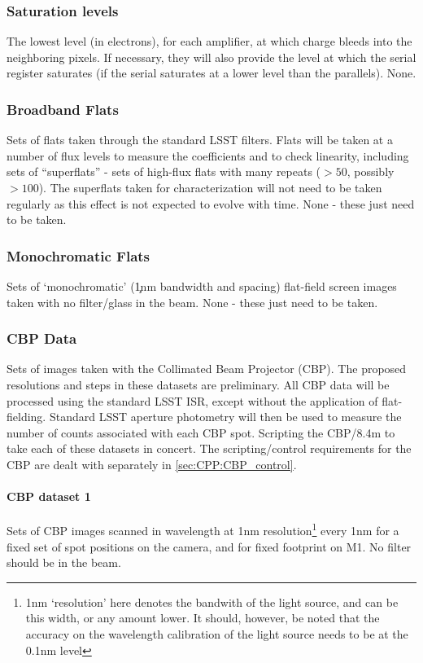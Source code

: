 \subsubsection{Saturation levels}\label{sec:CPP:inputs:saturationLevel}
\cameraTeam
The lowest level (in electrons), for each amplifier, at which charge bleeds into the neighboring pixels. If necessary, they will also provide the level at which the serial register saturates (\ie if the serial saturates at a lower level than the parallels).
\alg None.


\subsubsection{Broadband Flats}\label{sec:CPP:inputs:broadFlat}
Sets of flats taken through the standard LSST filters. Flats will be taken at a number of flux levels to measure the \bfeffect coefficients and to check linearity, including sets of ``superflats'' - sets of high-flux flats with many repeats ($>50$, possibly $>100$). The superflats taken for \bfeffect characterization will not need to be taken regularly as this effect is not expected to evolve with time.
\alg None - these just need to be taken.


\subsubsection{Monochromatic Flats}\label{sec:CPP:inputs:monoFlat}
Sets of `monochromatic' (\c 1nm bandwidth and spacing) flat-field screen images taken with no filter/glass in the beam.
\alg None - these just need to be taken.


\subsubsection{CBP Data}\label{sec:CPP:inputs:CBP}
Sets of images taken with the Collimated Beam Projector (CBP). The proposed resolutions and steps in these datasets are preliminary. All CBP data will be processed using the standard LSST ISR, except without the application of flat-fielding. Standard LSST aperture photometry will then be used to measure the number of counts associated with each CBP spot.
\alg Scripting the CBP/8.4m to take each of these datasets in concert. The scripting/control requirements for the CBP are dealt with separately in \secsymbol\ref{sec:CPP:CBP_control}.


\paragraph{CBP dataset 1}\label{sec:CPP:inputs:CBP:mono}
Sets of CBP images scanned in wavelength at 1nm resolution\footnote{1nm `resolution' here denotes the bandwith of the light source, and can be this width, or any amount lower. It should, however, be noted that the accuracy on the wavelength calibration of the light source needs to be at the 0.1nm level } every 1nm for a fixed set of spot positions on the camera, and for fixed footprint on M1. No filter should be in the beam.
	
